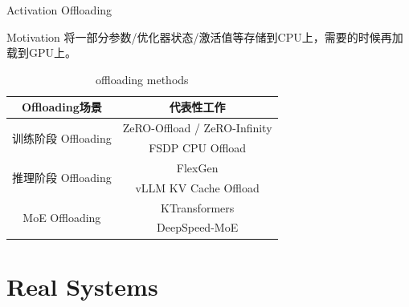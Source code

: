 \documentclass[aspectratio=169]{beamer}
\begin{document}
\begin{frame}{Activation Offloading}
    \begin{block}{Motivation}
        将一部分参数/优化器状态/激活值等存储到CPU上，需要的时候再加载到GPU上。
    \end{block}
    \begin{table}[htbp]
        \centering
        \begin{tabular}{cc}
            \toprule
            \textbf{Offloading场景} & \textbf{代表性工作} \\
            \midrule
            \multirow{2}{*}{训练阶段 Offloading} 
                & ZeRO-Offload\cite{ren2021zerooffloaddemocratizingbillionscalemodel} / ZeRO-Infinity \\
                & FSDP\cite{zhao2023pytorchfsdpexperiencesscaling} CPU Offload \\
            \midrule
            \multirow{2}{*}{推理阶段 Offloading} 
                & FlexGen\cite{sheng2023flexgenhighthroughputgenerativeinference} \\
                & vLLM\cite{kwon2023efficient} KV Cache Offload \\
            \midrule
            \multirow{2}{*}{MoE Offloading} 
                & KTransformers\cite{KTransformers} \\
                & DeepSpeed-MoE\cite{rajbhandari2022deepspeedmoeadvancingmixtureofexpertsinference} \\
            \bottomrule
        \end{tabular}
        \caption{offloading methods}
        \label{tab:offloading_methods}
    \end{table}
\end{frame}



\section{Real Systems}
\end{document}
